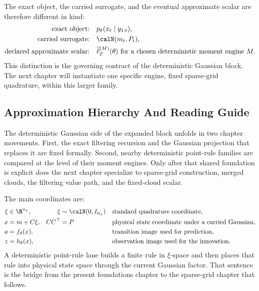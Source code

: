 The exact object, the carried surrogate, and the eventual approximate scalar are
therefore different in kind:
\begin{equation}
\begin{aligned}
  \text{exact object:}
  &\quad p_\theta(x_t\mid y_{1:t}), \\
  \text{carried surrogate:}
  &\quad \calN(m_t,P_t), \\
  \text{declared approximate scalar:}
  &\quad \widehat\ell_T^{(M)}(\theta)
  \text{ for a chosen deterministic moment engine } M.
\end{aligned}
  \label{eq:bf-hd-gq-exact-vs-approximate-summary}
\end{equation}
This distinction is the governing contract of the deterministic Gaussian block.
The next chapter will instantiate one specific engine, fixed sparse-grid
quadrature, within this larger family.

\subsection{Approximation Hierarchy And Reading Guide}
\label{sec:bf-hd-gq-hierarchy}

The deterministic Gaussian side of the expanded block unfolds in two chapter
movements.  First, the exact filtering recursion and the Gaussian projection that
replaces it are fixed formally.  Second, nearby deterministic point-rule families
are compared at the level of their moment engines.  Only after that shared
foundation is explicit does the next chapter specialize to sparse-grid
construction, merged clouds, the filtering value path, and the fixed-cloud
scalar.

The main coordinates are:
\begin{align}
  \xi &\in \R^{n_x},
  &\xi&\sim\calN(0,I_{n_x})
  &&\hbox{standard quadrature coordinate},
  \label{eq:bf-hd-gq-standard-coordinate}\\
  x &= m+C\xi,
  &CC^\top&=P
  &&\hbox{physical state coordinate under a carried Gaussian},
  \label{eq:bf-hd-gq-physical-coordinate}\\
  a &= f_\theta(x),
  &&
  &&\hbox{transition image used for prediction},
  \label{eq:bf-hd-gq-transition-coordinate}\\
  z &= h_\theta(x),
  &&
  &&\hbox{observation image used for the innovation}.
  \label{eq:bf-hd-gq-observation-coordinate}
\end{align}
A deterministic point-rule lane builds a finite rule in \(\xi\)-space and then
places that rule into physical state space through the current Gaussian factor.
That sentence is the bridge from the present foundations chapter to the
sparse-grid chapter that follows.

